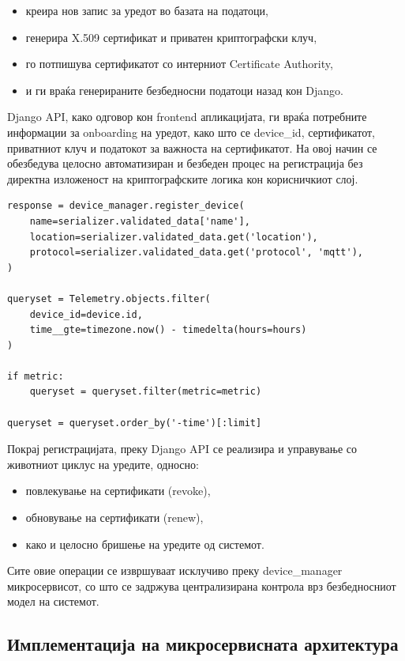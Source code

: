 \begin{itemize}
\item
  креира нов запис за уредот во базата на податоци,
\item
  генерира X.509 сертификат и приватен криптографски клуч,
\item
  го потпишува сертификатот со интерниот Certificate Authority,
\item
  и ги враќа генерираните безбедносни податоци назад кон Django.
\end{itemize}

Django API, како одговор кон frontend апликацијата, ги враќа потребните
информации за onboarding на уредот, како што се device\_id,
сертификатот, приватниот клуч и податокот за важноста на сертификатот.
На овој начин се обезбедува целосно автоматизиран и безбеден процес на
регистрација без директна изложеност на криптографските логика кон
корисничкиот слој.

\begin{verbatim}
response = device_manager.register_device(
    name=serializer.validated_data['name'],
    location=serializer.validated_data.get('location'),
    protocol=serializer.validated_data.get('protocol', 'mqtt'),
)

queryset = Telemetry.objects.filter(
    device_id=device.id,
    time__gte=timezone.now() - timedelta(hours=hours)
)

if metric:
    queryset = queryset.filter(metric=metric)

queryset = queryset.order_by('-time')[:limit]
\end{verbatim}

Покрај регистрацијата, преку Django API се реализира и управување со
животниот циклус на уредите, односно:

\begin{itemize}
\item
  повлекување на сертификати (revoke),
\item
  обновување на сертификати (renew),
\item
  како и целосно бришење на уредите од системот.
\end{itemize}

Сите овие операции се извршуваат исклучиво преку device\_manager
микросервисот, со што се задржува централизирана контрола врз
безбедносниот модел на системот.

\subsection{Имплементација на микросервисната архитектура}

